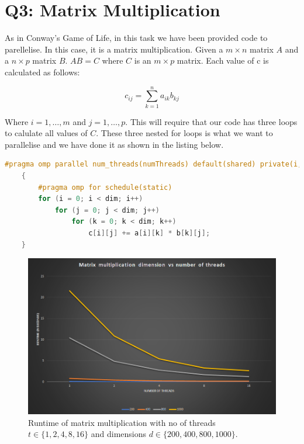 \section{Q3: Matrix Multiplication}

As in Conway's Game of Life, in this task we have been provided code to parellelise.
In this case, it is a matrix multiplication. Given a $m \times n$ matrix $A$ and
a $n \times p$ matrix $B$. $AB = C$ where $C$ is an $m \times p$ matrix. Each value
of c is calculated as follows:

\begin{equation}
    c_{ij} = \sum_{k=1}^{n} a_{ik}b_{kj}
\end{equation}

Where $i = 1, \dots, m$ and $j = 1, \dots, p$. This will require that our code 
has three loops to calulate all values of $C$. These three nested for loops 
is what we want to parallelise and we have done it as shown in the listing below.

\begin{lstlisting}[language=C++]
    #pragma omp parallel num_threads(numThreads) default(shared) private(i, j, k)
    {
        #pragma omp for schedule(static)
        for (i = 0; i < dim; i++)
            for (j = 0; j < dim; j++)
                for (k = 0; k < dim; k++)
                    c[i][j] += a[i][k] * b[k][j];
    }
\end{lstlisting}

\begin{figure}
    \centering
    \includegraphics[width=\linewidth]{Figures/Matmul.png}
    \caption{
        Runtime of matrix multiplication with no of threads $t \in \{1,2,4,8,16\}$
        and dimensions $d \in \{200,400,800,1000\}$.
    }
    \label{fig:matmulspeedup}
\end{figure}

